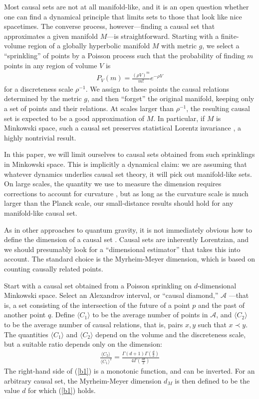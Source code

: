 \documentclass[12pt]{article}
\begin{document}
Most causal sets are not at all manifold-like, and it is an open question whether one
can find a dynamical principle that limits sets to those that look like nice spacetimes.
The converse process, however---finding a causal set that approximates
a given manifold $M$---is straightforward.   Starting with a finite-volume region of a
globally hyperbolic manifold $M$ with metric $g$, we select  a ``sprinkling'' of points
by a Poisson process such that the probability of finding $m$ points in any region of
volume $V$ is
\begin{align}
P_V(m) = \frac{(\rho V)^m}{m!}e^{-\rho V}
\label{a1}
\end{align}
for a discreteness scale $\rho^{-1}$.  We assign to these points the causal relations
determined by the metric $g$, and then ``forget'' the original manifold, keeping only
a set of points and their relations.   At scales larger than $\rho^{-1}$, the resulting
causal set is expected to be a good approximation of $M$.  In particular, if $M$ is
Minkowski space, such a causal set preserves statistical Lorentz invariance \cite{LIV},
a highly nontrivial result.

In this paper, we will limit ourselves to causal sets obtained from such sprinklings in
Minkowski space.  This is implicitly a dynamical claim: we are assuming that whatever
dynamics underlies causal set theory, it will pick out manifold-like sets.  On large
scales, the quantity we use to measure the dimension requires corrections to
account for curvature \cite{Roy}, but as long as the curvature scale is much larger
than the Planck scale, our small-distance results should hold for any manifold-like
causal set.

As in other approaches to quantum gravity, it is not immediately obvious how to
define the dimension of a causal set \cite{Carlipy}.  Causal sets are inherently
Lorentzian, and we should presumably look for a ``dimensional estimator'' that
takes this into account.  The standard choice is the Myrheim-Meyer dimension,
which is based on counting causally related points.

Start with a causal set obtained from a Poisson sprinkling on $d$-dimensional
Minkowski space.  Select an Alexandrov interval, or ``causal diamond,'' $\mathcal{A}$%
---that is, a set consisting of the intersection of the future of a point $p$ and the past
of another point $q$.  Define $\langle C_1\rangle$ to be the average number of
points in $\mathcal{A}$, and $\langle C_2\rangle$ to be the average number of causal
relations, that is, pairs $x,y$ such that $x\prec y$.  The quantities $\langle C_1\rangle$
and $\langle C_2\rangle$ depend on the volume and the discreteness scale, but a
suitable ratio depends only on the dimension:
\begin{align}
\frac{\langle C_2\rangle\,}{\langle C_1\rangle^2} =
   \frac{\Gamma(d+1)\Gamma(\frac{d}{2})}{4\Gamma(\frac{3d}{2})}
\label{b1}
\end{align}
The right-hand side of (\ref{b1}) is a monotonic function, and can be inverted.
For an arbitrary causal set, the Myrheim-Meyer dimension $d_M$ is then defined to
be the value $d$ for which (\ref{b1}) holds.
\end{document}
